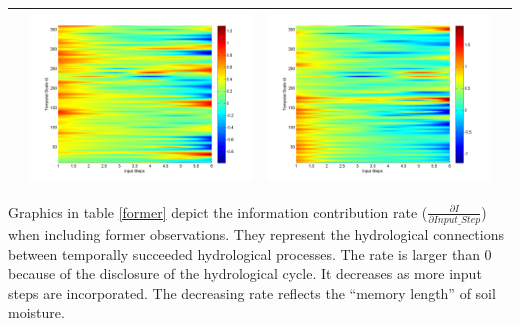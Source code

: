 \documentclass[11pt]{article}
\begin{document}
\begin{table}[H]
{\begin{tabular}{cccc}
&\begin{minipage}{.3\textwidth}\includegraphics[width=\linewidth]{resultgraph/06810000epdiff_former.png}\end{minipage}
&\begin{minipage}{.3\textwidth}\includegraphics[width=\linewidth]{resultgraph/06810000qdiff_former.png}\end{minipage}
\\
\bottomrule
\end{tabular}
}
\end{table}

Graphics in table \ref{former} depict the information contribution rate ($\frac{\partial I}{\partial Input\_Step}$) when including former observations. They represent the hydrological connections between temporally succeeded hydrological processes. The rate is larger than 0 because of the disclosure of the hydrological cycle. It decreases as more input steps are incorporated. The decreasing rate reflects the ``memory length'' of soil moisture.  
 
\end{document}
